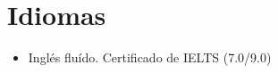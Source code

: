 \documentclass[11pt, letterpaper, sans]{moderncv}        %
\begin{document}
\section{Idiomas}
\vspace{6pt}

\begin{itemize}
	\item Inglés flu\'ido. Certificado de IELTS (7.0/9.0)
\end{itemize}

\vfill
\enlargethispage{\footskip}
\let\thefootnote\relax{}
\end{document}
